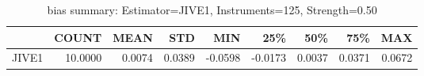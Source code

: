 \begin{table}[ht]
\centering
\caption{bias summary: Estimator=JIVE1, Instruments=125, Strength=0.50}
\begin{tabular}{lrrrrrrrr}
\toprule
 & COUNT & MEAN & STD & MIN & 25\% & 50\% & 75\% & MAX \\
\midrule
JIVE1 & 10.0000 & 0.0074 & 0.0389 & -0.0598 & -0.0173 & 0.0037 & 0.0371 & 0.0672 \\
\bottomrule
\end{tabular}
\end{table}

